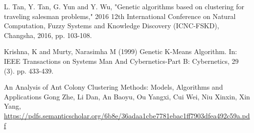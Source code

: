\documentclass[10pt]{article}
\begin{document}
\begin{thebibliography}{9}
L. Tan, Y. Tan, G. Yun and Y. Wu, "Genetic algorithms based on clustering for traveling salesman problems," 2016 12th International Conference on Natural Computation, Fuzzy Systems and Knowledge Discovery (ICNC-FSKD), Changsha, 2016, pp. 103-108.

Krishna, K and Murty, Narasimha M (1999) Genetic K-Means Algorithm. In: IEEE Transactions on Systems Man And Cybernetics-Part B: Cybernetics, 29 (3). pp. 433-439.

An Analysis of Ant Colony Clustering Methods: Models, Algorithms and Applications Gong Zhe, Li Dan, An Baoyu, Ou Yangxi, Cui Wei, Niu Xinxin, Xin Yang, \url{https://pdfs.semanticscholar.org/6b8e/36adaa1cbe7781ebac1ff7903dfea492c59a.pdf}
\end{thebibliography}
\end{document}

